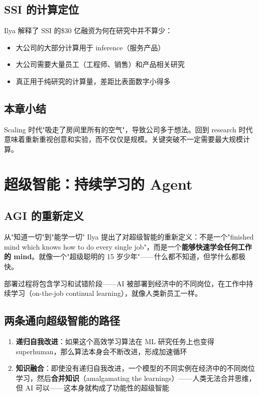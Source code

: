 \documentclass[a4paper]{article}
\begin{document}
\subsection{SSI 的计算定位}

Ilya 解释了 SSI 的\$30 亿融资为何在研究中并不算少：
\begin{itemize}
    \item 大公司的大部分计算用于 inference（服务产品）
    \item 大公司需要大量员工（工程师、销售）和产品相关研究
    \item 真正用于纯研究的计算量，差距比表面数字小得多
\end{itemize}

\subsection{本章小结}

Scaling 时代"吸走了房间里所有的空气"，导致公司多于想法。回到 research 时代意味着重新重视创意和实验，而不仅仅是规模。关键突破不一定需要最大规模计算。


\section{超级智能：持续学习的 Agent}

\subsection{AGI 的重新定义}

\begin{importantbox}{从"知道一切"到"能学一切"}
Ilya 提出了对超级智能的重新定义：不是一个"finished mind which knows how to do every single job"，而是一个\textbf{能够快速学会任何工作的 mind}。就像一个"超级聪明的 15 岁少年"——什么都不知道，但学什么都极快。
\end{importantbox}

部署过程将包含学习和试错阶段——AI 被部署到经济中的不同岗位，在工作中持续学习（on-the-job continual learning），就像人类新员工一样。

\subsection{两条通向超级智能的路径}

\begin{enumerate}
    \item \textbf{递归自我改进}：如果这个高效学习算法在 ML 研究任务上也变得 superhuman，那么算法本身会不断改进，形成加速循环
    \item \textbf{知识融合}：即使没有递归自我改进，一个模型的不同实例在经济中的不同岗位学习，然后\textbf{合并知识}（amalgamating the learnings）——人类无法合并思维，但 AI 可以——这本身就构成了功能性的超级智能
\end{enumerate}
\end{document}

